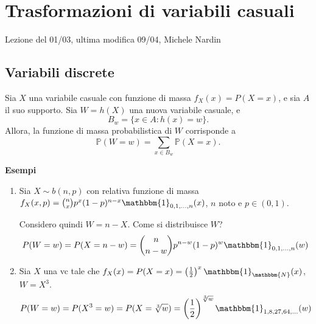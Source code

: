 
\section{Trasformazioni di variabili casuali}
Lezione del 01/03, ultima modifica 09/04, Michele Nardin
\subsection{Variabili discrete}
\begin{thm}
Sia \(X\) una variabile casuale con funzione di massa \(f_X(x)=P(X=x)\), e sia \(A\) il suo supporto.
Sia \(W=h(X)\) una nuova variabile casuale, e
\begin{equation*}
  B_w = \lbrace x \in A \colon h(x) = w\rbrace.
\end{equation*}
Allora, la funzione di massa probabilistica di \(W\) corrisponde a
\begin{equation}
  \mathbb{P}(W=w)=\sum_{x \in B_w}\mathbb{P}(X=x).
\end{equation}
\end{thm}

\noindent \textbf{Esempi}
\begin{enumerate}

\item Sia $X \sim b(n,p)$ con relativa funzione di massa 
$f_X(x,p)=\binom{n}{x}p^x(1-p)^{n-x}\mathbbm{1}_{0,1,...,n}(x)$,
$n$ noto e $p\in(0,1)$.

Considero quindi $W=n-X$. Come si distribuisce $W$? 
$$P(W=w)=P(X=n-w)=\binom{n}{n-w}p^{n-w}(1-p)^w\mathbbm{1}_{0,1,...,n}(w)$$
\item Sia $X$ una vc tale che 
$f_X(x)=P(X=x)=\left(\frac{1}{2}\right)^x\mathbbm{1}_\mathbbm{N}(x)$, $W=X^3$. 
$$P(W=w)=P(X^3=w)=P(X=\sqrt[3]{w})=\left(\frac{1}{2}\right)^{\sqrt[3]{w}}\mathbbm{1}_{1,8,27,64,...}(w)$$
\end{enumerate}

